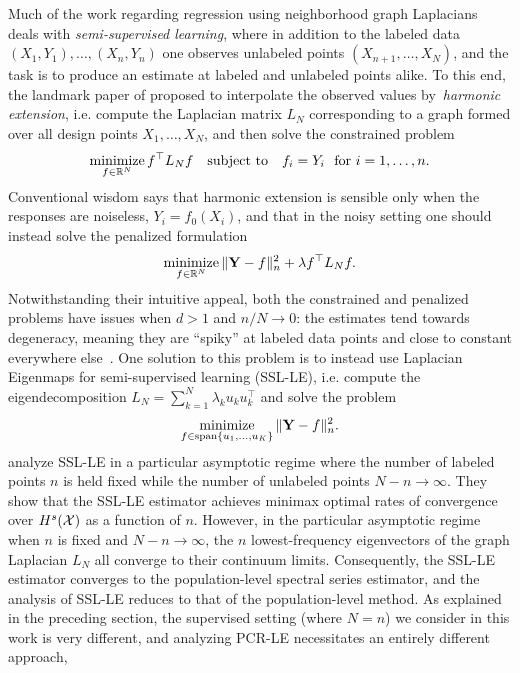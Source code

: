 Much of the work regarding regression using neighborhood graph Laplacians deals with \emph{semi-supervised learning}, where in addition to the labeled data $(X_1,Y_1),\ldots,(X_n,Y_n)$ one observes unlabeled points $(X_{n + 1},\ldots,X_{N})$, and the task is to produce an estimate at labeled and unlabeled points alike. To this end, the landmark paper of \cite{zhu2003semisupervised} proposed to interpolate the observed values by~\emph{harmonic extension}, i.e. compute the Laplacian matrix $L_N$  corresponding to a graph formed over all design points $X_1,\ldots,X_N$, and then solve the constrained problem
\begin{equation*}
\mathop{\mathrm{minimize}}_{f \in \mathbb{R}^N} f^{\top} L_N f \quad \mathrm{subject\,\,to}~~~ f_i = Y_i~~\textrm{for $i = 1,\ldots,n$.}
\end{equation*}
Conventional wisdom says that harmonic extension is sensible only when the responses are noiseless, $Y_i = f_0(X_i)$, and that in the noisy setting one should instead solve the penalized formulation
\begin{equation}
\label{eqn:graph_laplacian_regularization_ssl}
\mathop{\mathrm{minimize}}_{f \in \mathbb{R}^N} \|{\bf Y} - f\|_n^2 + \lambda f^{\top} L_N f.
\end{equation}
Notwithstanding their intuitive appeal, both the constrained and penalized problems have issues when $d > 1$ and $n/N \to 0$: the estimates tend towards degeneracy, meaning they are ``spiky'' at labeled data points and close to constant everywhere else~\citep{nadler09,calder2019b, calder2020}. One solution to this problem is to instead use Laplacian Eigenmaps for semi-supervised learning (SSL-LE), i.e. compute the eigendecomposition $L_N = \sum_{k = 1}^{N} \lambda_k u_k u_k^{\top}$ and solve the problem
\begin{equation}
\label{eqn:laplacian_eigenmaps_ssl}
\mathop{\mathrm{minimize}}_{f \in \mathrm{span}\{u_1,\ldots,u_K\}} \|{\bf Y} - f\|_n^2.
\end{equation}
\cite{zhou2011,lee2016} analyze SSL-LE in a particular asymptotic regime where the number of labeled points $n$ is held fixed while the number of unlabeled points $N - n \to \infty$. They show that the SSL-LE estimator achieves minimax optimal rates of convergence over $H^s(\mathcal{X})$ as a function of $n$. However, in the particular asymptotic regime when $n$ is fixed and $N - n \to \infty$, the $n$ lowest-frequency eigenvectors of the graph Laplacian $L_N$ all converge to their continuum limits. Consequently, the SSL-LE estimator converges to the population-level spectral series estimator, and the analysis of SSL-LE reduces to that of the population-level method. As explained in the preceding section, the supervised setting (where $N = n$) we consider in this work is very different, and analyzing PCR-LE necessitates an entirely different approach, 

